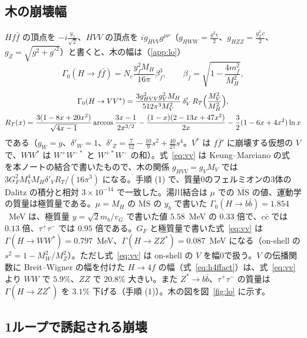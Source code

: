 \documentclass[a4paper,10pt]{ltjsarticle}
\newcommand{\MSbar}{\overline{\mathrm{MS}}}
\begin{document}
\subsection{木の崩壊幅}\label{sec:lo}

$Hf\bar f$ の頂点を $-i\frac{y_f}{\sqrt2}$、$HVV$ の頂点を $ig_{HVV}g^{\mu\nu}$（$g_{HWW}=\frac{g^2v}2$、$g_{HZZ}=\frac{g_Z^2v}2$、$g_Z=\sqrt{g^2+g'^2}$）と書くと、木の幅は（\ref{app:lo}）
\begin{equation}
\Gamma_0(H\to f\bar f)=N_c\frac{y_f^2M_H}{16\pi}\beta_f^3,\qquad \beta_f=\sqrt{1-\frac{4m_f^2}{M_H^2}},
\label{eq:lo}
\end{equation}
\begin{equation}
\begin{gathered}
\Gamma_0(H\to VV^*)=\frac{3g_{HVV}^2g_V^2M_H}{512\pi^3M_V^2}\,\delta'_V\,R_T\Bigl(\frac{M_V^2}{M_H^2}\Bigr),\\
R_T(x)=\frac{3(1-8x+20x^2)}{\sqrt{4x-1}}\arccos\frac{3x-1}{2x^{3/2}}-\frac{(1-x)(2-13x+47x^2)}{2x}-\frac32(1-6x+4x^2)\ln x
\end{gathered}
\label{eq:vv}
\end{equation}
である（$g_W=g$、$\delta'_W=1$、$\delta'_Z=\frac7{12}-\frac{10}9s^2+\frac{40}{27}s^4$。$V^*$ は $f\bar f'$ に崩壊する仮想の $V$ で、$WW^*$ は $W^+W^{-*}$ と $W^{+*}W^-$ の和）。式~\eqref{eq:vv} は Keung--Marciano の式~\cite{km84,djouadi08} を本ノートの結合で書いたもので、木の関係 $g_{HVV}=g_VM_V$ では $3G_F^2M_V^4M_H\delta'_VR_T/(16\pi^3)$ になる。手順 (1) で、質量0のフェルミオンの3体の Dalitz の積分と相対 $3\times10^{-14}$ で一致した。湯川結合は $\mu$ での $\MSbar$ の値、運動学の質量は極質量である。$\mu=M_H$ の $\MSbar$ の $y_b$ で書いた $\Gamma_0(H\to b\bar b)=1.854$~MeV は、極質量 $y=\sqrt2m_b/v_G$ で書いた値 $5.58$~MeV の $0.33$ 倍で、$c\bar c$ では $0.13$ 倍、$\tau^+\tau^-$ では $0.95$ 倍である。$G_F$ と極質量で書いた式~\eqref{eq:vv} は $\Gamma(H\to WW^*)=0.797$~MeV、$\Gamma(H\to ZZ^*)=0.087$~MeV になる（on-shell の $s^2=1-M_W^2/M_Z^2$）。ただし式~\eqref{eq:vv} は on-shell の $V$ を幅0で扱う。$V$ の伝播関数に Breit--Wigner の幅を付けた $H\to4f$ の幅（式~\eqref{eq:h4ffact}）は、式~\eqref{eq:vv} より $WW$ で $5.9\%$、$ZZ$ で $20.8\%$ 大きい。また $Z^*\to b\bar b$、$\tau^+\tau^-$ の質量は $\Gamma(H\to ZZ^*)$ を $3.1\%$ 下げる（手順 (1)）。木の図を図~\ref{fig:lo} に示す。

\subsection{1ループで誘起される崩壊}\label{sec:loop}
\end{document}
